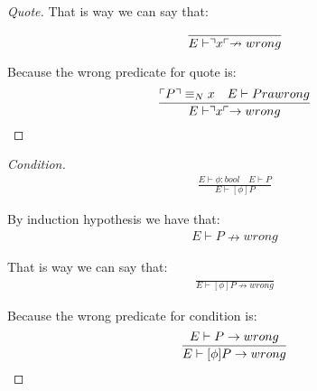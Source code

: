 \begin{theorem}
\begin{proof}[Quote]
That is way we can say that:
\begin{align*}
\frac{}{E \vdash \urcorner x \ulcorner \nrightarrow wrong}
\end{align*}

Because the wrong predicate for quote is:
\begin{align*}
\frac{\ulcorner P \urcorner \equiv _N x \quad E \vdash P ra wrong}{E \vdash \urcorner x \ulcorner \rightarrow wrong}
\end{align*}

\end{proof}

\begin{proof}[Condition]
\begin{align*}
\frac{E \vdash \phi : bool \quad E \vdash P}{E \vdash [\phi]P}
\end{align*}

By induction hypothesis we have that:
\begin{align*}
E \vdash P \nrightarrow wrong
\end{align*}

That is way we can say that:
\begin{align*}
\frac{}{E \vdash [\phi ]P \nrightarrow wrong}
\end{align*}

Because the wrong predicate for condition is:
\begin{align*}
\frac{E \vdash P \rightarrow wrong}{E \vdash [\phi ]P \rightarrow wrong}
\end{align*}
\end{proof}
\end{theorem}






\FloatBarrier
